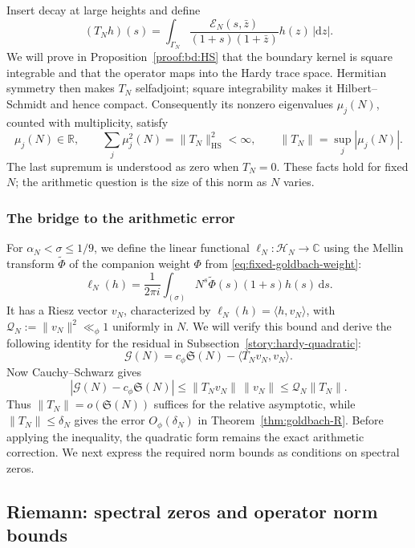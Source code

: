\documentclass[12pt,a4paper]{amsart}
\numberwithin{equation}{section}
\def\le{\leqslant}
\theoremstyle{plain}
\theoremstyle{definition}
\theoremstyle{remark}
\begin{document}
\label{story:operator}
Insert decay at large heights and define
\begin{equation}\label{qp:operator}
 (T_Nh)(s)=\int_{\Gamma_N}
       \frac{\mathscr E_N(s,\bar z)}{(1+s)(1+\bar z)}h(z)\,|\mathrm{d}z|.
\end{equation}
We will prove in Proposition~\ref{proof:bd:HS} that the boundary
kernel is square integrable and that the operator maps into the
Hardy trace space. Hermitian symmetry then makes $T_N$
selfadjoint; square integrability makes it Hilbert--Schmidt and
hence compact. Consequently its nonzero eigenvalues $\mu_j(N)$,
counted with multiplicity, satisfy
\[
 \mu_j(N)\in\mathbb R,\qquad
 \sum_j\mu_j^2(N)=\|T_N\|_{\mathrm{HS}}^2<\infty,
 \qquad \|T_N\|=\sup_j|\mu_j(N)|.
\]
The last supremum is understood as zero when $T_N=0$.
These facts hold for fixed $N$; the arithmetic question is the
size of this norm as $N$ varies.

\subsubsection{The bridge to the arithmetic error}

For $\alpha_N<\sigma\le1/9$, we define the linear functional
$\ell_N:\mathcal H_N\to\mathbb C$ using the Mellin transform
$\widetilde\Phi$ of the companion weight $\Phi$ from
\eqref{eq:fixed-goldbach-weight}:
\[
 \ell_N(h)=\frac1{2\pi i}\int_{(\sigma)}
       N^s\widetilde\Phi(s)(1+s)h(s)\,\mathrm{d}s.
\]
It has a Riesz vector $v_N$, characterized by
$\ell_N(h)=\langle h,v_N\rangle$, with
$\mathcal Q_N:=\|v_N\|^2\ll_\phi1$ uniformly in $N$.
We will verify this bound and derive the following identity for the
residual in Subsection~\ref{story:hardy-quadratic}:
\[
 \mathcal G(N)=c_\phi\mathfrak S(N)-\langle T_Nv_N,v_N\rangle.
\]
Now Cauchy--Schwarz gives
\begin{equation}\label{v3f:master-error-formula}
 |\mathcal G(N)-c_\phi\mathfrak S(N)|
 \le\|T_Nv_N\|\,\|v_N\|
 \le\mathcal Q_N\|T_N\|.
\end{equation}
Thus $\|T_N\|=o(\mathfrak S(N))$ suffices for the relative
asymptotic, while $\|T_N\|\le\delta_N$ gives the error
$O_\phi(\delta_N)$ in Theorem~\ref{thm:goldbach-R}.
Before applying the inequality, the quadratic form remains the
exact arithmetic correction. We next express the required norm
bounds as conditions on spectral zeros.

\subsection{Riemann: spectral zeros and operator norm bounds}
\label{story:riemann}
\end{document}
